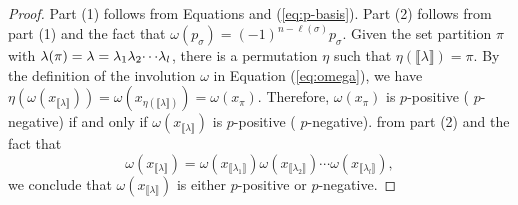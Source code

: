 \documentclass[12pt]{amsart}  %
\theoremstyle{definition}
\theoremstyle{remark}
\numberwithin{equation}{section}
\newcommand{\pnc}{{p}}                %
\newcommand{\xnc}{{x}}                 %
\newcommand\svw[1]{{\color{black}{#1}}}
\begin{document}
\begin{proof}
Part (1) follows from Equations \svw{(\ref{eq:mymun})} and (\ref{eq:p-basis}). Part (2) follows from part (1) and the fact that $\omega(\pnc_{\sigma})=(-1)^{n-\ell(\sigma)}\pnc_{\sigma}.$ Given the set partition $\pi$ with $\lambda(\pi)=\lambda=\lambda_1\lambda_2 \svw{\cdots} \lambda_l$, \svw{we know} there is a permutation $\eta$ such that $\eta(\llbracket \lambda \rrbracket)=\pi$. By the definition of the involution $\omega$ in Equation (\ref{eq:omega}), we have $\eta(\omega(\xnc_{\llbracket \lambda \rrbracket}))=\omega(\xnc_{\eta(\llbracket \lambda \rrbracket)})=\omega(\xnc_\pi)$. Therefore, $\omega(\xnc_\pi)$ is $p$-positive (\svw{respectively} $\pnc$-negative) if and only if $\omega(\xnc_{\llbracket \lambda \rrbracket})$ is $p$-positive (\svw{respectively} $\pnc$-negative). \svw{However,} from part (2) and the fact that 
$$\omega(\xnc_{\llbracket \lambda \rrbracket})=\omega( x_{\llbracket \lambda_1\rrbracket})\omega(x_{\llbracket \lambda_2\rrbracket })\cdots\omega(x_{\llbracket \lambda_l\rrbracket}),$$ we conclude that $\omega(\xnc_{\llbracket \lambda \rrbracket})$ is either $p$-positive or $p$-negative.
\end{proof}



%
%
% 
%
%
\end{document}
